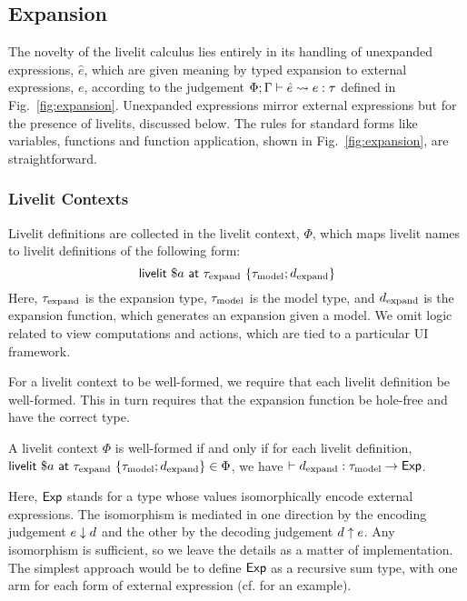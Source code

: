 \subsection{Expansion}\label{sec:calculus-expansion}

The novelty of the livelit calculus lies entirely in its handling of unexpanded expressions,
$\hat e$, which are given meaning by typed expansion to external expressions,
$e$, according to the judgement $\Phi; \Gamma \vdash \hat e \leadsto e : \tau$
defined in Fig.~\ref{fig:expansion}.
Unexpanded expressions mirror external expressions but for the presence of livelits, discussed below.
The rules for standard
forms like variables, functions and function application, shown in Fig.~\ref{fig:expansion},
are straightforward.

\subsubsection{Livelit Contexts}

Livelit definitions are collected in the livelit context, $\Phi$, which
maps livelit names to livelit definitions of the following form:
\[ \mathsf{livelit}~\$a~\mathsf{at}~\tau_\text{expand}~\{\tau_\text{model}; d_\text{expand}\} \]
Here, $\tau_\text{expand}$ is the expansion type, $\tau_\text{model}$ is the model type,
and $d_\text{expand}$ is the expansion function, which generates an expansion given a model.
We omit logic related to view computations and actions, which are tied to a particular 
UI framework.

For a livelit context to be well-formed, we require that each livelit definition be well-formed.
This in turn requires that the expansion function be hole-free and have the correct type.
\begin{definition}
    A livelit context $\Phi$ is well-formed if and only if for each livelit definition,
    $\mathsf{livelit}~\$a~\mathsf{at}~\tau_\text{expand}~\{\tau_\text{model}; d_\text{expand}\} \in \Phi$,  we have
    $\vdash d_\text{expand} : \tau_\text{model} \rightarrow \mathsf{Exp}$.
\end{definition}
Here, $\mathsf{Exp}$ stands for a type whose values isomorphically encode
external expressions. The isomorphism is mediated in one direction by
the encoding judgement $e \downarrow d$ and the other by the decoding judgement $d \uparrow e$.
Any isomorphism is sufficient, so we leave the details as a matter of implementation.
The simplest approach would be to define $\mathsf{Exp}$ as a recursive sum type,
with one arm for each form of external expression (cf. \cite{TSLs} for an example).


